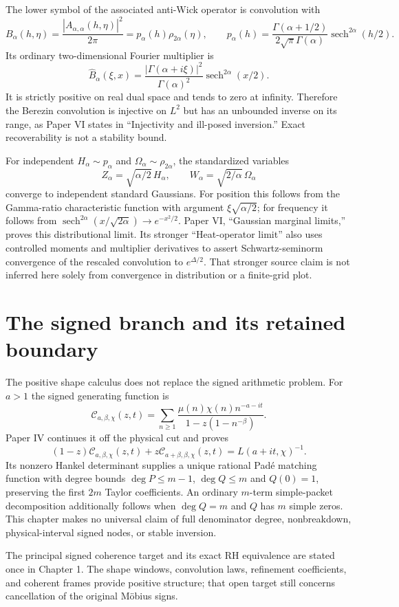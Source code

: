 The lower symbol of the associated anti-Wick operator is convolution with
\[
 B_\alpha(h,\eta)=\frac{|A_{\alpha,\alpha}(h,\eta)|^2}{2\pi}
 =p_\alpha(h)\rho_{2\alpha}(\eta),\qquad
 p_\alpha(h)=\frac{\Gamma(\alpha+1/2)}{2\sqrt\pi\Gamma(\alpha)}
 \operatorname{sech}^{2\alpha}(h/2).
\]
Its ordinary two-dimensional Fourier multiplier is
\[
 \widehat B_\alpha(\xi,x)
 =\frac{|\Gamma(\alpha+i\xi)|^2}{\Gamma(\alpha)^2}
 \operatorname{sech}^{2\alpha}(x/2).
\]
It is strictly positive on real dual space and tends to zero at infinity.
Therefore the Berezin convolution is injective on $L^2$ but has an unbounded
inverse on its range, as Paper VI states in ``Injectivity and ill-posed
inversion.'' Exact recoverability is not a stability bound.

For independent $H_\alpha\sim p_\alpha$ and
$\Omega_\alpha\sim\rho_{2\alpha}$, the standardized variables
\[
 Z_\alpha=\sqrt{\alpha/2}\,H_\alpha,\qquad
 W_\alpha=\sqrt{2/\alpha}\,\Omega_\alpha
\]
converge to independent standard Gaussians. For position this follows from the
Gamma-ratio characteristic function with argument
$\xi\sqrt{\alpha/2}$; for frequency it follows from
$\operatorname{sech}^{2\alpha}(x/\sqrt{2\alpha})\to e^{-x^2/2}$.
Paper VI, ``Gaussian marginal limits,'' proves this distributional limit.
Its stronger ``Heat-operator limit'' also uses controlled moments and
multiplier derivatives to assert Schwartz-seminorm convergence of the
rescaled convolution to $e^{\Delta/2}$. That stronger source claim is not
inferred here solely from convergence in distribution or a finite-grid plot.

\section{The signed branch and its retained boundary}

The positive shape calculus does not replace the signed arithmetic problem.
For $a>1$ the signed generating function is
\[
 \mathcal C_{a,\beta,\chi}(z,t)
 =\sum_{n\geq1}\frac{\mu(n)\chi(n)n^{-a-it}}{1-z(1-n^{-\beta})}.
\]
Paper IV continues it off the physical cut and proves
\[
 (1-z)\mathcal C_{a,\beta,\chi}(z,t)
 +z\mathcal C_{a+\beta,\beta,\chi}(z,t)=L(a+it,\chi)^{-1}.
\]
Its nonzero Hankel determinant supplies a unique rational Pad\'e matching
function with degree bounds $\deg P\leq m-1$, $\deg Q\leq m$ and
$Q(0)=1$, preserving the first $2m$ Taylor coefficients. An ordinary
$m$-term simple-packet decomposition additionally follows when $\deg Q=m$
and $Q$ has $m$ simple zeros. This chapter makes no universal claim of full
denominator degree, nonbreakdown, physical-interval signed nodes, or stable
inversion.

The principal signed coherence target and its exact RH equivalence are
stated once in Chapter 1. The shape windows, convolution laws, refinement
coefficients, and coherent frames provide positive structure; that open target
still concerns cancellation of the original M\"obius signs.
